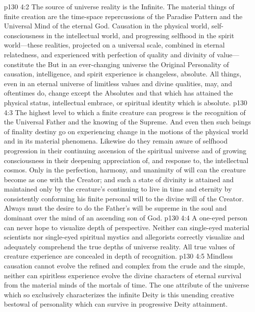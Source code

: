 \pc \vs p130 4:2 The source of universe reality is the Infinite. The material things of finite creation are the time\hyp{}space repercussions of the Paradise Pattern and the Universal Mind of the eternal God. Causation in the physical world, self\hyp{}consciousness in the intellectual world, and progressing selfhood in the spirit world---these realities, projected on a universal scale, combined in eternal relatedness, and experienced with perfection of quality and divinity of value---constitute the  But in an ever\hyp{}changing universe the Original Personality of causation, intelligence, and spirit experience is changeless, absolute. All things, even in an eternal universe of limitless values and divine qualities, may, and oftentimes do, change except the Absolutes and that which has attained the physical status, intellectual embrace, or spiritual identity which is absolute.
\vs p130 4:3 The highest level to which a finite creature can progress is the recognition of the Universal Father and the knowing of the Supreme. And even then such beings of finality destiny go on experiencing change in the motions of the physical world and in its material phenomena. Likewise do they remain aware of selfhood progression in their continuing ascension of the spiritual universe and of growing consciousness in their deepening appreciation of, and response to, the intellectual cosmos. Only in the perfection, harmony, and unanimity of will can the creature become as one with the Creator; and such a state of divinity is attained and maintained only by the creature’s continuing to live in time and eternity by consistently conforming his finite personal will to the divine will of the Creator. Always must the desire to do the Father’s will be supreme in the soul and dominant over the mind of an ascending son of God.
\vs p130 4:4 A one\hyp{}eyed person can never hope to visualize depth of perspective. Neither can single\hyp{}eyed material scientists nor single\hyp{}eyed spiritual mystics and allegorists correctly visualize and adequately comprehend the true depths of universe reality. All true values of creature experience are concealed in depth of recognition.
\vs p130 4:5 Mindless causation cannot evolve the refined and complex from the crude and the simple, neither can spiritless experience evolve the divine characters of eternal survival from the material minds of the mortals of time. The one attribute of the universe which so exclusively characterizes the infinite Deity is this unending creative bestowal of personality which can survive in progressive Deity attainment.

